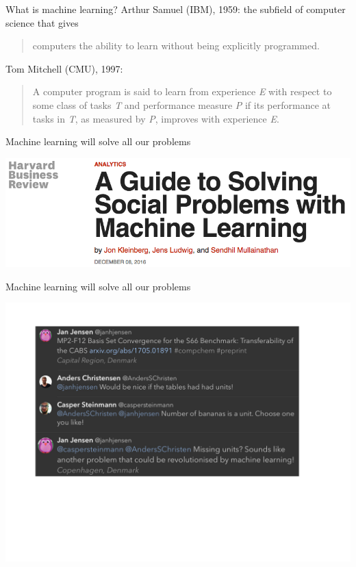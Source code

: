 \documentclass[compress]{beamer}
\begin{document}
\begin{frame}{What is machine learning?}
  Arthur Samuel (IBM), 1959: the subfield of computer science that gives
  \begin{quote}
    computers the ability to learn without being explicitly programmed.
  \end{quote}
  Tom Mitchell (CMU), 1997:
  \begin{quote}
    A computer program is said to learn from experience \textit{E} with respect to some class of tasks \textit{T} and performance measure \textit{P} if its performance at tasks in \textit{T}, as measured by \textit{P}, improves with experience \textit{E}.
  \end{quote}
\end{frame}

\begin{frame}{Machine learning will solve all our problems}
  \begin{center}
    \includegraphics[width=1.00\textwidth]{./figures/headline.png}
  \end{center}
\end{frame}

\begin{frame}{Machine learning will solve all our problems}
  \begin{center}
    \includegraphics[width=1.10\textwidth]{./figures/twitter.jpeg}
  \end{center}
\end{frame}
\end{document}
